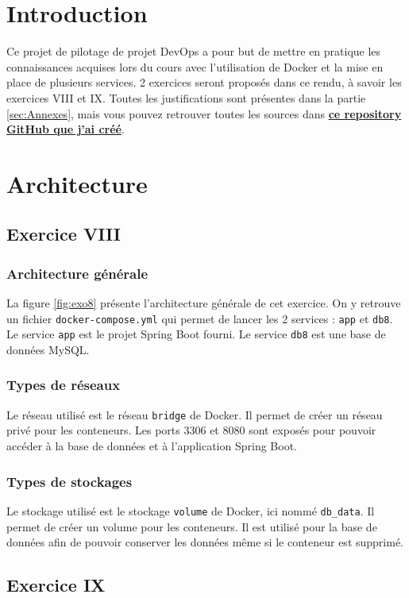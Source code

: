 \section{Introduction}
Ce projet de pilotage de projet DevOps a pour but de mettre en pratique les connaissances acquises lors du cours avec l'utilisation de Docker et la mise en place de plusieurs services. 2 exercices seront proposés dans ce rendu, à savoir les exercices VIII et IX.
Toutes les justifications sont présentes dans la partie \ref{sec:Annexes}, mais vous pouvez retrouver toutes les sources dans \href{https://github.com/RemiSaurel/docker-homework}{\textbf{ce repository GitHub que j'ai créé}}.


\section{Architecture}
\subsection{Exercice VIII}
\subsubsection*{Architecture générale}
La figure \ref{fig:exo8} présente l'architecture générale de cet exercice. On y retrouve un fichier \verb|docker-compose.yml| qui permet de lancer les 2 services : \verb|app| et \verb|db8|. Le service \verb|app| est le projet Spring Boot fourni. Le service \verb|db8| est une base de données MySQL.

\subsubsection*{Types de réseaux}
Le réseau utilisé est le réseau \verb|bridge| de Docker. Il permet de créer un réseau privé pour les conteneurs. Les ports 3306 et 8080 sont exposés pour pouvoir accéder à la base de données et à l'application Spring Boot.
\subsubsection*{Types de stockages}
Le stockage utilisé est le stockage \verb|volume| de Docker, ici nommé \verb|db_data|. Il permet de créer un volume pour les conteneurs. Il est utilisé pour la base de données afin de pouvoir conserver les données même si le conteneur est supprimé.

\subsection{Exercice IX}
